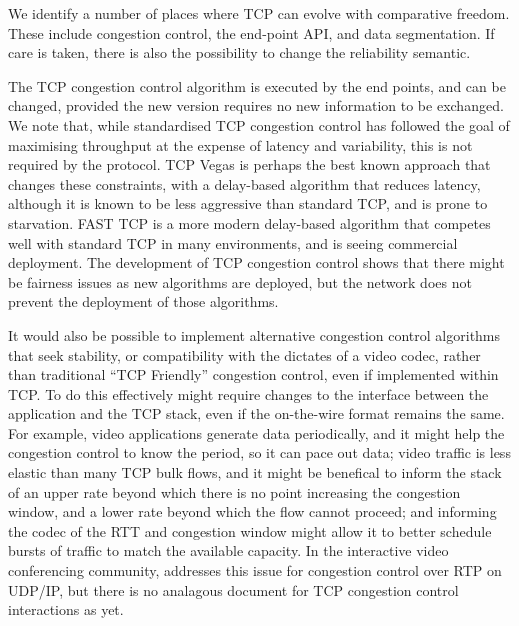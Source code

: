\documentclass{sig-alternate-05-2015}
\begin{document}
We identify a number of places where TCP can evolve with comparative
freedom. These include congestion control, the end-point API, and data
segmentation. If care is taken, there is also the possibility to change
the reliability semantic.

The TCP congestion control algorithm is executed by the end points, and
can be changed, provided the new version requires no new information to
be exchanged.
We note that, while standardised TCP congestion control has followed the
goal of maximising throughput at the expense of latency and variability,
this is not required by the protocol. TCP Vegas \cite{brakmo:1994:tcp-vegas}
is perhaps the best known approach that changes these constraints, with a
delay-based algorithm that reduces latency, although it is known to be less
aggressive than standard TCP, and is prone to starvation. FAST TCP 
\cite{jin:2004:fast-tcp} is a more modern delay-based algorithm that 
competes well with standard TCP in many environments, and is seeing 
commercial deployment.  The development of TCP congestion control shows
that there might be fairness issues as new algorithms are deployed, but the
network does not prevent the deployment of those algorithms. 

It would also be possible to implement alternative congestion control
algorithms that seek stability, or compatibility with the dictates of a
video codec, rather than traditional ``TCP Friendly'' congestion control,
even if implemented within TCP.
To do this effectively might require changes to the interface between the
application and the TCP stack, even if the on-the-wire format remains the
same. For example, video applications generate data periodically, and it
might help the congestion control to know the period, so it can pace out
data; video traffic is less elastic than many TCP bulk flows, and it might
be benefical to inform the stack of an upper rate beyond which there is no
point increasing the congestion window, and a lower rate beyond which the 
flow cannot proceed; and informing the codec of the RTT and congestion
window might allow it to better schedule bursts of traffic to match the 
available capacity. In the interactive video conferencing community, 
\cite{draft-ietf-rmcat-cc-codec-interactions-02} addresses this issue for
congestion control over RTP on UDP/IP, but there is no analagous document
for TCP congestion control interactions as yet. 
\end{document}
